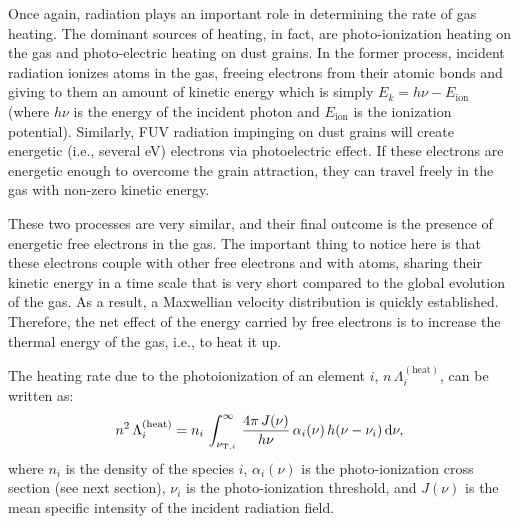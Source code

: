 Once again, radiation plays an important role in determining the rate of gas heating. The dominant sources of heating, in fact, are photo-ionization heating on the gas and photo-electric heating on dust grains. In the former process, incident radiation ionizes atoms in the gas, freeing electrons from their atomic bonds and giving to them an amount of kinetic energy which is simply $E_k = h\nu - E_\mathrm{ion}$ (where $h\nu$ is the energy of the incident photon and $E_\mathrm{ion}$ is the ionization potential). Similarly, FUV radiation impinging on dust grains will create energetic (i.e., several eV) electrons via photoelectric effect. If these electrons are energetic enough to overcome the grain attraction, they can travel freely in the gas with non-zero kinetic energy. 

These two processes are very similar, and their final outcome is the presence of energetic free electrons in the gas. The important thing to notice here is that these electrons couple with other free electrons and with atoms, sharing their kinetic energy in a time scale that is very short compared to the global evolution of the gas. As a result, a Maxwellian velocity distribution is quickly established. Therefore, the net effect of the energy carried by free electrons is to increase the thermal energy of the gas, i.e., to heat it up.

The heating rate due to the photoionization of an element $i$, $n\,\Lambda_i^{\mathrm{(heat)}}$, can be written as:
\begin{align}
    n^2 \,\Lambda^\mathrm{(heat)}_i = n_i\,\int_{\nu_{\mathrm{T},i}}^\infty \,\frac{4\pi\,J(\nu)}{h\nu} \,\alpha_i(\nu)\,h(\nu-\nu_i)\,\mathrm{d} \nu,
\end{align}
where $n_i$ is the density of the species $i$, $\alpha_i(\nu)$ is the photo-ionization cross section (see next section), $\nu_i$ is the photo-ionization threshold, and $J(\nu)$ is the mean specific intensity of the incident radiation field. 


